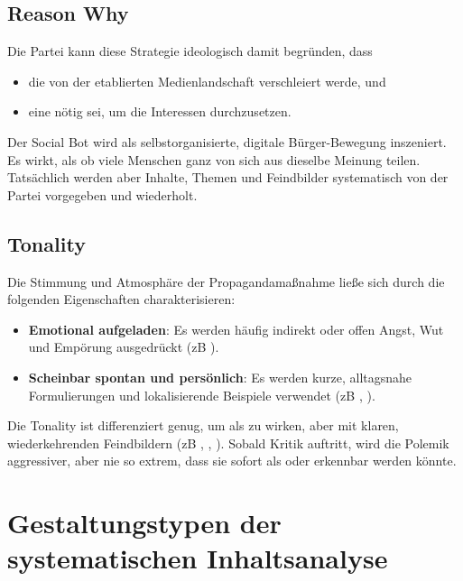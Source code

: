 \subsection{Reason Why}
\label{sec:04-04-04_reason-why}

Die Partei kann diese Strategie ideologisch damit begründen, dass

\begin{itemize}
    \item die  von der etablierten Medienlandschaft verschleiert werde, und
    \item eine  nötig sei, um die Interessen  durchzusetzen.
\end{itemize}

Der Social Bot wird als selbstorganisierte, digitale Bürger-Bewegung inszeniert. Es wirkt, als ob viele Menschen ganz von sich aus dieselbe Meinung teilen. Tatsächlich werden aber Inhalte, Themen und Feindbilder systematisch von der Partei vorgegeben und wiederholt.

\subsection{Tonality}
\label{sec:04-04-05_tonality}

Die Stimmung und Atmosphäre der Propagandamaßnahme ließe sich durch die folgenden Eigenschaften charakterisieren:

\begin{itemize}
    \item \textbf{Emotional aufgeladen}: Es werden häufig indirekt oder offen Angst, Wut und Empörung ausgedrückt (\acrshort{zB} ).
    \item \textbf{Scheinbar spontan und persönlich}: Es werden kurze, alltagsnahe Formulierungen und lokalisierende Beispiele verwendet (\acrshort{zB} , ).
\end{itemize}

Die Tonality ist differenziert genug, um als  zu wirken, aber mit klaren, wiederkehrenden Feindbildern (\acrshort{zB} , , ). Sobald Kritik auftritt, wird die Polemik aggressiver, aber nie so extrem, dass sie sofort als  oder  erkennbar werden könnte.

\section{Gestaltungstypen der systematischen Inhaltsanalyse}
\label{sec:04-05_design-types-of-systematic-content-analysis}

